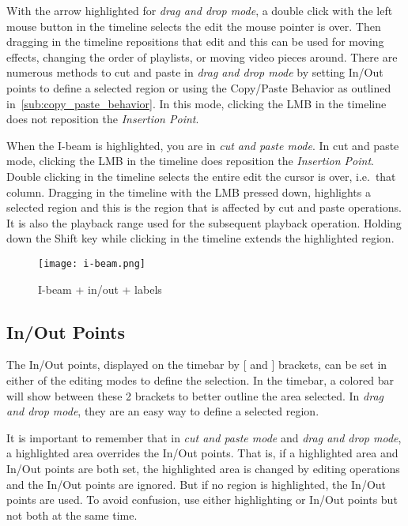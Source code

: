 With the arrow highlighted for \emph{drag and drop mode}, a double click with the left mouse button in the timeline selects the edit the mouse pointer is over. 
Then dragging in the timeline repositions that edit and this can be used for moving effects,
changing the order of playlists, or moving video pieces around. 
There are numerous methods to cut and paste in \emph{drag and drop mode} by setting In/Out points to define
a selected region or using the Copy/Paste Behavior as outlined in~\ref{sub:copy_paste_behavior}. 
In this mode, clicking the LMB in the timeline does not reposition the \textit{Insertion Point}. 

When the I-beam is highlighted, you are in \emph{cut and paste mode}.
In cut and paste mode, clicking the LMB in the timeline does reposition the \textit{Insertion Point}. 
Double clicking in the timeline selects the entire edit the cursor is over, i.e.\ that column. 
Dragging in the timeline with the LMB pressed down, highlights a selected region and this is the region that is affected by cut
and paste operations.  It is also the playback range used for the subsequent playback operation. 
Holding down the Shift key while clicking in the timeline extends the highlighted region.

\begin{figure}[htpb]
    \centering
    \texttt{[image: i-beam.png]}
    \caption{I-beam + in/out  +  labels}
    \label{fig:i-beam}
\end{figure}

\subsection{In/Out Points}%
\label{sub:in_out_points}

The In/Out points, displayed on the timebar by [ and ] brackets,  can be set in either of the editing modes to define the selection.
In the timebar, a colored bar will show between these 2 brackets to better outline the area selected.
In \emph{drag and drop mode}, they are an easy way to define a selected region.

It is important to remember that in \emph{cut and paste mode} and \emph{drag and drop mode}, a highlighted area 
overrides the In/Out points. That is, if a highlighted area and In/Out points are both set, the highlighted area is changed by editing operations and the In/Out points are ignored. 
But if no region is highlighted, the In/Out points are used. 
To avoid confusion, use either highlighting or In/Out points but not both at the same time.

